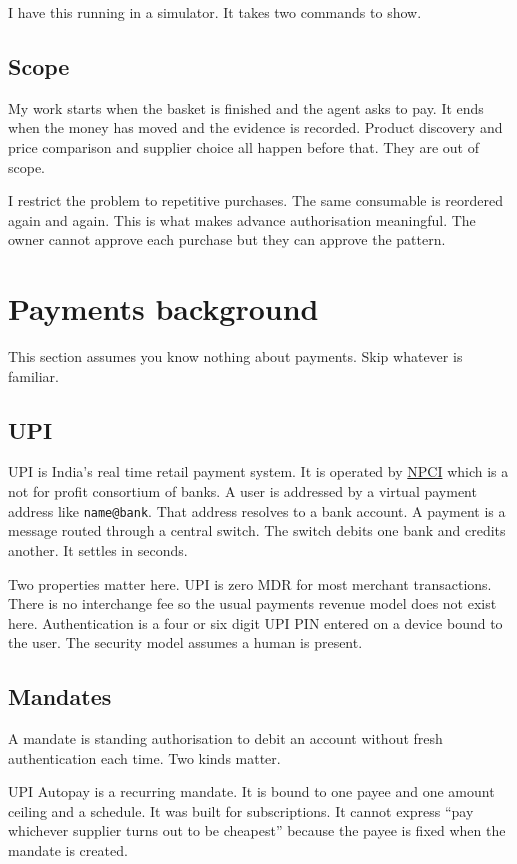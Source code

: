 \documentclass[journal,onecolumn,11pt]{IEEEtran}
\begin{document}
I have this running in a simulator. It takes two commands to show.

\subsection{Scope}
My work starts when the basket is finished and the agent asks to pay. It ends when the
money has moved and the evidence is recorded. Product discovery and price comparison and
supplier choice all happen before that. They are out of scope.

I restrict the problem to repetitive purchases. The same consumable is reordered again
and again. This is what makes advance authorisation meaningful. The owner cannot approve
each purchase but they can approve the pattern.

\section{Payments background}\label{sec:bg}

This section assumes you know nothing about payments. Skip whatever is familiar.

\subsection{UPI}
UPI is India's real time retail payment system. It is operated by
\href{https://www.npci.org.in/what-we-do/upi}{NPCI} which is a not for profit consortium
of banks. A user is addressed by a virtual payment address like \texttt{name@bank}. That
address resolves to a bank account. A payment is a message routed through a central
switch. The switch debits one bank and credits another. It settles in seconds.

Two properties matter here. UPI is zero MDR for most merchant transactions. There is
no interchange fee so the usual payments revenue model does not exist here.
Authentication is a four or six digit UPI PIN entered on a device bound to the user. The
security model assumes a human is present.

\subsection{Mandates}
A mandate is standing authorisation to debit an account without fresh authentication
each time. Two kinds matter.

UPI Autopay is a recurring mandate. It is bound to one payee and one amount ceiling and
a schedule. It was built for subscriptions. It cannot express ``pay whichever supplier
turns out to be cheapest'' because the payee is fixed when the mandate is created.
\end{document}
